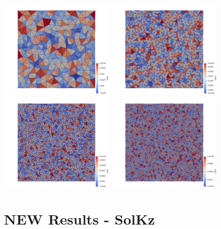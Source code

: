 \begin{center}
\includegraphics[width=5.7cm]{python_codes/fieldstone_120/images/unstructured16}
\includegraphics[width=5.7cm]{python_codes/fieldstone_120/images/unstructured32}\\
\includegraphics[width=5.7cm]{python_codes/fieldstone_120/images/unstructured48}
\includegraphics[width=5.7cm]{python_codes/fieldstone_120/images/unstructured64}
\end{center}


\newpage
\section*{NEW Results - SolKz}

